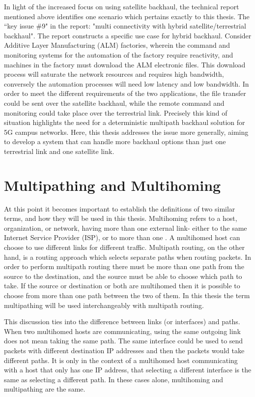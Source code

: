 In light of the increased focus on using satellite backhaul, the technical report mentioned above identifies one scenario which pertains exactly to this thesis. The “key issue \#9" in the report: "multi connectivity with hybrid satellite/terrestrial backhaul". The report constructs a specific use case for hybrid backhaul. Consider Additive Layer Manufacturing (ALM) factories, wherein the command and monitoring systems for the automation of the factory require reactivity, and machines in the factory must download the ALM electronic files. This download process will saturate the network resources and requires high bandwidth, conversely the automation processes will need low latency and low bandwidth. In order to meet the different requirements of the two applications, the file transfer could be sent over the satellite backhaul, while the remote command and monitoring could take place over the terrestrial link. Precisely this kind of situation highlights the need for a deterministic multipath backhaul solution for 5G campus networks. Here, this thesis addresses the issue more generally, aiming to develop a system that can handle more backhaul options than just one terrestrial link and one satellite link.


\section{Multipathing and Multihoming}

At this point it becomes important to establish the definitions of two similar terms, and how they will be used in this thesis. Multihoming refers to a host, organization, or network, having more than one external link- either to the same Internet Service Provider (ISP), or to more than one \cite{akella2003measurement}. A multihomed host can choose to use different links for different traffic. Multipath routing, on the other hand, is a routing approach which selects separate paths when routing packets. In order to perform multipath routing there must be more than one path from the source to the destination, and the source must be able to choose which path to take. If the source or destination or both are multihomed then it is possible to choose from more than one path between the two of them. In this thesis the term multipathing will be used interchangeably with multipath routing.

This discussion ties into the difference between links (or interfaces) and paths. When two multihomed hosts are communicating, using the same outgoing link does not mean taking the same path. The same interface could be used to send packets with different destination IP addresses and then the packets would take different paths. It is only in the context of a multihomed host communicating with a host that only has one IP address, that selecting a different interface is the same as selecting a different path. In these cases alone, multihoming and multipathing are the same.

